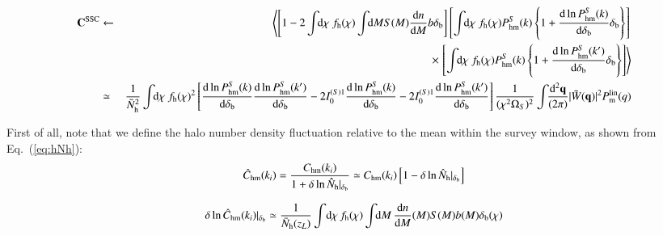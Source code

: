 \documentclass[onecolumn,notitlepage,showpacs,amsmath,amssymb,prd,floatfix]{revtex4-1}
\newcommand{\bq}{{\bf q}}
\newcommand{\tW}{\tilde{W}}
\newcommand{\dr}{\mathrm{d}}
\newcommand{\deltab}{\delta_{\rm b}}
\newcommand{\chm}{C_{\mathrm{hm}}}
\newcommand{\hchm}{\hat{C}_{\mathrm{hm}}}
\newcommand{\bh}{\mathrm{h}}
\newcommand{\bnh}{\frac{\dr n}{\dr M}}
\newcommand{\pml}{P^{\rm lin}_{\rm m}}
\newcommand{\hNh}{\hat{N}_{\rm h}}
\newcommand{\bNh}{\bar{N}_{\rm h}}
\begin{document}
\begin{eqnarray}
 {\bf C}^{\rm SSC}&\leftarrow &\left\langle
  \left[1-2
\int\!\!\dr\chi~f_{\rm h}(\chi)\int\!\!\dr MS(M)\bnh b\deltab
  \right]
  \left[
   \int\!\!\dr\chi~f_{\rm h}(\chi)P^{S}_{\rm hm}(k)\left\{
1+
\frac{\dr\ln P^{S}_{\rm hm}(k)}{\dr \deltab}\deltab
				  \right\}
  \right]\right.\nonumber\\
&&\hspace{12em}\times \left.  \left[
   \int\!\!\dr\chi~f_{\rm h}(\chi)P^{S}_{\rm hm}(k)\left\{
1+
\frac{\dr\ln P^{S}_{\rm hm}(k')}{\dr \deltab}
\deltab\right\}
				 \right]\right\rangle\nonumber\\
 &\simeq &
\frac{1}{\bNh^2}
\int \!\!\dr\chi~f_{\rm h}(\chi)^2
\left[
\frac{\dr\ln P^{S}_{\rm hm}(k)}{\dr \deltab}
\frac{\dr\ln P^{S}_{\rm hm}(k')}{\dr \deltab}
-2I^{(S)1}_0
\frac{\dr\ln P^{S}_{\rm hm}(k)}{\dr \deltab}
-2I^{(S)1}_0
\frac{\dr\ln P^{S}_{\rm hm}(k')}{\dr \deltab}
\right]\frac{1}{(\chi^2\Omega_S)^2}\int\!\!\frac{\dr^2\bq}{(2\pi)}|\tW(\bq)|^2\pml(q)
\end{eqnarray}

First of all, note that we define the halo number density fluctuation
relative to the mean within the survey window, as shown from
Eq.~(\ref{eq:hNh}): 
%
\begin{equation}
 \hchm(k_i)=\frac{\chm(k_i)}{1+\delta \ln\hNh|_{\deltab}}\simeq
  \chm(k_i)
  \left[1-\delta\ln\hNh|_{\deltab}\right]
\end{equation}

\begin{eqnarray}
 \delta\ln\hchm(k_i)|_{\deltab}\simeq \frac{1}{\bNh(z_L)}\int\!\dr \chi\,
  f_\bh(\chi)\int\!\!\dr M\, \bnh(M)S(M)b(M)\deltab(\chi)
\end{eqnarray}
\end{document}

